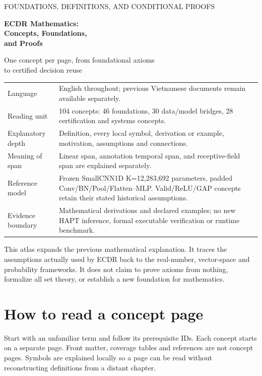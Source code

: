 \documentclass[11pt,a4paper]{article}
\begin{document}
\hypersetup{pageanchor=false}
\begin{titlepage}
\vspace*{1cm}
{\Large\color{teal} FOUNDATIONS, DEFINITIONS, AND CONDITIONAL PROOFS\par}
\vspace{0.7cm}
{\huge\bfseries\color{ink} ECDR Mathematics:\\Concepts, Foundations,\\and Proofs\par}
\vspace{0.8cm}
{\Large One concept per page, from foundational axioms\\to certified decision reuse\par}
\vspace{1cm}
\begin{tabularx}{\linewidth}{@{}P{3.2cm}Y@{}}\toprule
Language & English throughout; previous Vietnamese documents remain available separately.\\
Reading unit & 104 concepts: 46 foundations, 30 data/model bridges, 28 certification and systems concepts.\\
Explanatory depth & Definition, every local symbol, derivation or example, motivation, assumptions and connections.\\
Meaning of span & Linear span, annotation temporal span, and receptive-field span are explained separately.\\
Reference model & Frozen SmallCNN1D K=12,283,692 parameters, padded Conv/BN/Pool/Flatten--MLP. Valid/ReLU/GAP concepts retain their stated historical assumptions.\\
Evidence boundary & Mathematical derivations and declared examples; no new HAPT inference, formal executable verification or runtime benchmark.\\\bottomrule
\end{tabularx}
\vfill
This atlas expands the previous mathematical explanation. It traces the
assumptions actually used by ECDR back to the real-number, vector-space and
probability frameworks. It does not claim to prove axioms from nothing,
formalize all set theory, or establish a new foundation for mathematics.
\end{titlepage}
\hypersetup{pageanchor=true}
\section*{How to read a concept page}
Start with an unfamiliar term and follow its prerequisite IDs. Each concept
starts on a separate page. Front matter, coverage tables and references are
not concept pages. Symbols are explained locally so a page can be read
without reconstructing definitions from a distant chapter.
\end{document}
